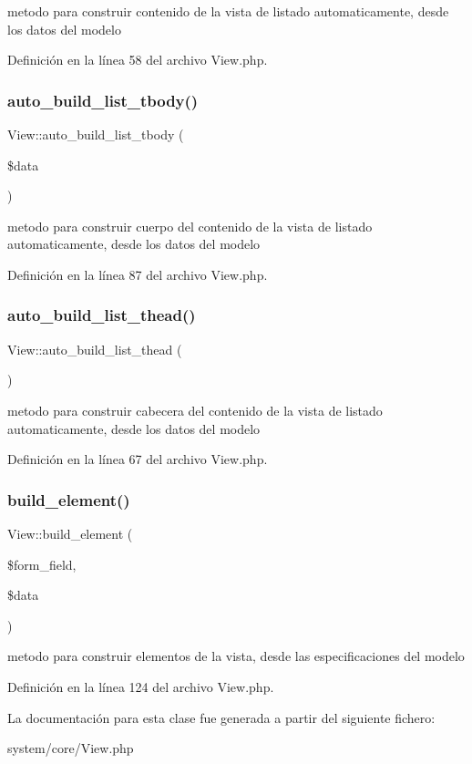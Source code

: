 metodo para construir contenido de la vista de listado automaticamente, desde los datos del modelo 

Definición en la línea 58 del archivo View.\+php.

\mbox{\label{class_view_aaf8b264482d9d19af83177579be7ba3e}} 
\subsubsection{\texorpdfstring{auto\_build\_list\_tbody()}{auto\_build\_list\_tbody()}}
{\footnotesize\ttfamily View\+::auto\+\_\+build\+\_\+list\+\_\+tbody (\begin{DoxyParamCaption}\item[{}]{\$data }\end{DoxyParamCaption})}

metodo para construir cuerpo del contenido de la vista de listado automaticamente, desde los datos del modelo 

Definición en la línea 87 del archivo View.\+php.

\mbox{\label{class_view_ac55cd1801295517a7f9fad0d41ddf6d1}} 
\subsubsection{\texorpdfstring{auto\_build\_list\_thead()}{auto\_build\_list\_thead()}}
{\footnotesize\ttfamily View\+::auto\+\_\+build\+\_\+list\+\_\+thead (\begin{DoxyParamCaption}{ }\end{DoxyParamCaption})}

metodo para construir cabecera del contenido de la vista de listado automaticamente, desde los datos del modelo 

Definición en la línea 67 del archivo View.\+php.

\mbox{\label{class_view_ab2f8d0f1c16e7971856e5535d9fc286e}} 
\subsubsection{\texorpdfstring{build\_element()}{build\_element()}}
{\footnotesize\ttfamily View\+::build\+\_\+element (\begin{DoxyParamCaption}\item[{}]{\$form\+\_\+field,  }\item[{}]{\$data }\end{DoxyParamCaption})}

metodo para construir elementos de la vista, desde las especificaciones del modelo 

Definición en la línea 124 del archivo View.\+php.



La documentación para esta clase fue generada a partir del siguiente fichero\+:\begin{DoxyCompactItemize}
\item 
system/core/View.\+php\end{DoxyCompactItemize}
